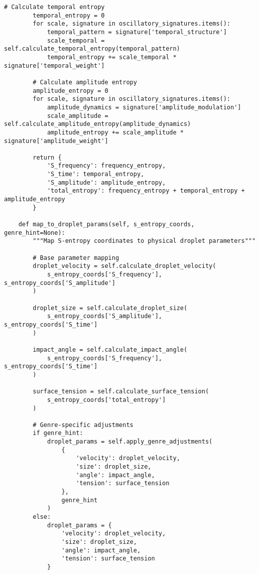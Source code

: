 \documentclass[12pt,a4paper]{article}
\begin{document}
\begin{lstlisting}[style=pythonstyle, caption=Core Audio-to-Drip Implementation]
        # Calculate temporal entropy
        temporal_entropy = 0
        for scale, signature in oscillatory_signatures.items():
            temporal_pattern = signature['temporal_structure']
            scale_temporal = self.calculate_temporal_entropy(temporal_pattern)
            temporal_entropy += scale_temporal * signature['temporal_weight']
        
        # Calculate amplitude entropy
        amplitude_entropy = 0
        for scale, signature in oscillatory_signatures.items():
            amplitude_dynamics = signature['amplitude_modulation']
            scale_amplitude = self.calculate_amplitude_entropy(amplitude_dynamics)
            amplitude_entropy += scale_amplitude * signature['amplitude_weight']
        
        return {
            'S_frequency': frequency_entropy,
            'S_time': temporal_entropy,
            'S_amplitude': amplitude_entropy,
            'total_entropy': frequency_entropy + temporal_entropy + amplitude_entropy
        }
    
    def map_to_droplet_params(self, s_entropy_coords, genre_hint=None):
        """Map S-entropy coordinates to physical droplet parameters"""
        
        # Base parameter mapping
        droplet_velocity = self.calculate_droplet_velocity(
            s_entropy_coords['S_frequency'], s_entropy_coords['S_amplitude']
        )
        
        droplet_size = self.calculate_droplet_size(
            s_entropy_coords['S_amplitude'], s_entropy_coords['S_time']
        )
        
        impact_angle = self.calculate_impact_angle(
            s_entropy_coords['S_frequency'], s_entropy_coords['S_time']
        )
        
        surface_tension = self.calculate_surface_tension(
            s_entropy_coords['total_entropy']
        )
        
        # Genre-specific adjustments
        if genre_hint:
            droplet_params = self.apply_genre_adjustments(
                {
                    'velocity': droplet_velocity,
                    'size': droplet_size, 
                    'angle': impact_angle,
                    'tension': surface_tension
                },
                genre_hint
            )
        else:
            droplet_params = {
                'velocity': droplet_velocity,
                'size': droplet_size,
                'angle': impact_angle,
                'tension': surface_tension
            }
        

\end{lstlisting}
\end{document}
